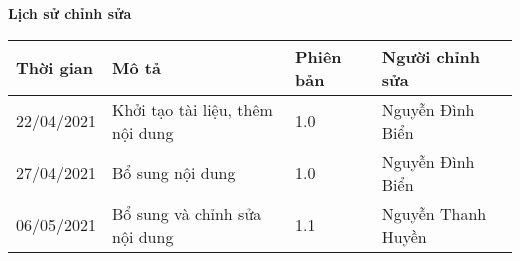 \documentclass[./main.tex]{subfiles}
\begin{document}
\begin{center}
	\Large{\textbf{Lịch sử chỉnh sửa}}
	\begin{table}[H]
		\begin{tabular}{|p{}|p{}|p{}|p{}|}
			\hline
			\textbf{Thời gian} & \textbf{Mô tả}                   & \textbf{Phiên bản} & \textbf{Người chỉnh sửa} \\ \hline
			22/04/2021         & Khởi tạo tài liệu, thêm nội dung & 1.0                & Nguyễn Đình Biển         \\\hline
			27/04/2021         & Bổ sung nội dung                 & 1.0                & Nguyễn Đình Biển         \\\hline
			06/05/2021         & Bổ sung và chỉnh sửa  nội dung   & 1.1                & Nguyễn Thanh Huyền       \\\hline
		\end{tabular}
	\end{table}
\end{center}
\end{document}
